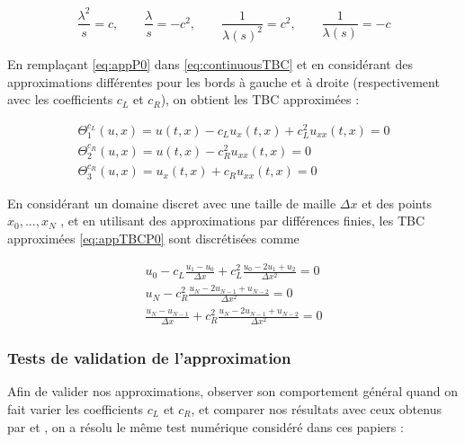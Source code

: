 \begin{equation}
	\label{eq:appP0}
	\frac{\lambda^2}{s}  = c, \qquad
	\frac{\lambda}{s}  = -c^2, \qquad
	\frac{1}{\lambda(s)^2}  = c^2,\qquad 
	 \frac{1}{\lambda(s)}  = -c 
\end{equation}

\indent En remplaçant \eqref{eq:appP0}  dans \eqref{eq:continuousTBC} et en considérant des approximations différentes pour les bords à gauche et à droite (respectivement avec les coefficients $c_L$ et $c_R$), on obtient les TBC approximées :

\begin{equation}
\label{eq:appTBCP0}
    \begin{gathered}
        \Theta_1^{c_L}(u,x) = u(t,x) - c_L u_x(t,x)  + c_L^2  u_{xx}(t,x) = 0 \\
        \Theta_2^{c_R}(u,x) = u(t,x) - c_R^2  u_{xx}(t,x) = 0 \\
        \Theta_3^{c_R}(u,x) = u_x(t,x) + c_R u_{xx}(t,x)= 0 
    \end{gathered}
\end{equation}

\indent En considérant un domaine discret avec une taille de maille $\Delta x$ et des points $x_0, ..., x_N$ , et en utilisant des approximations par différences finies, les TBC approximées \eqref{eq:appTBCP0} sont discrétisées comme

\begin{equation*}
    \begin{gathered}
        u_0 - c_L \frac{u_1 - u_0}{\Delta x}  + c_L^2  \frac{u_0 -2u_1 + u_2}{\Delta x^2} = 0 \\
        u_N - c_R^2    \frac{u_N -2u_{N-1} + u_{N-2}}{\Delta x^2} = 0 \\
        \frac{u_N - u_{N-1}}{\Delta x}  + c_R^2    \frac{u_N -2u_{N-1} + u_{N-2}}{\Delta x^2} = 0 
    \end{gathered}
\end{equation*}

\subsubsection{Tests de validation de l'approximation}

\indent Afin de valider nos approximations, observer son comportement général quand on fait varier les coefficients $c_L$ et $c_R$, et comparer nos résultats avec ceux obtenus par \cite{zheng2008} et \cite{besse2015} , on a résolu le même test numérique considéré dans ces papiers : 

